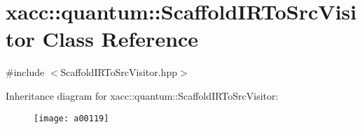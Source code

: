 \hypertarget{a00119}{}\section{xacc\+:\+:quantum\+:\+:Scaffold\+I\+R\+To\+Src\+Visitor Class Reference}
\label{a00119}


{\ttfamily \#include $<$Scaffold\+I\+R\+To\+Src\+Visitor.\+hpp$>$}

Inheritance diagram for xacc\+:\+:quantum\+:\+:Scaffold\+I\+R\+To\+Src\+Visitor\+:\begin{figure}[H]
\begin{center}
\leavevmode
\texttt{[image: a00119]}
\end{center}
\end{figure}
